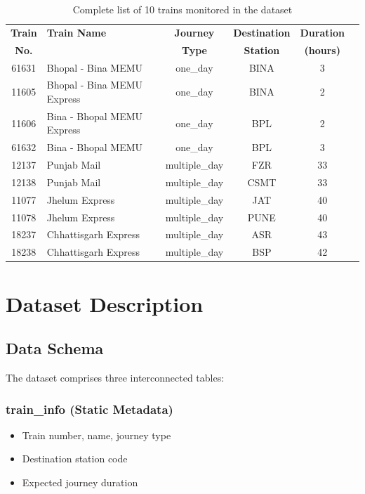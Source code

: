 \documentclass[conference]{IEEEtran}
\begin{document}
\begin{table}[t]
\centering
\caption{Complete list of 10 trains monitored in the dataset}
\label{tab:train_info}
\small
\begin{tabular}{@{}clcccc@{}}
\toprule
\textbf{Train} & \textbf{Train Name} & \textbf{Journey} & \textbf{Destination} & \textbf{Duration} \\
\textbf{No.} & & \textbf{Type} & \textbf{Station} & \textbf{(hours)} \\
\midrule
61631 & Bhopal - Bina MEMU & one\_day & BINA & 3 \\
11605 & Bhopal - Bina MEMU Express & one\_day & BINA & 2 \\
11606 & Bina - Bhopal MEMU Express & one\_day & BPL & 2 \\
61632 & Bina - Bhopal MEMU & one\_day & BPL & 3 \\
12137 & Punjab Mail & multiple\_day & FZR & 33 \\
12138 & Punjab Mail & multiple\_day & CSMT & 33 \\
11077 & Jhelum Express  & multiple\_day & JAT & 40 \\
11078 & Jhelum Express & multiple\_day & PUNE & 40 \\
18237 & Chhattisgarh Express & multiple\_day & ASR & 43 \\
18238 & Chhattisgarh Express & multiple\_day & BSP & 42 \\
\bottomrule
\end{tabular}
\end{table}

\section{Dataset Description}

\subsection{Data Schema}

The dataset comprises three interconnected tables:

\subsubsection{train\_info (Static Metadata)}
\begin{itemize}
    \item Train number, name, journey type
    \item Destination station code
    \item Expected journey duration
\end{itemize}
\end{document}
